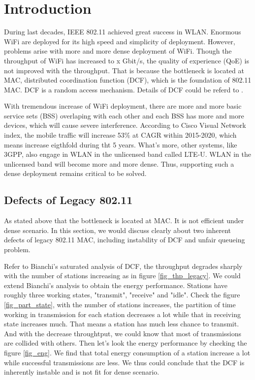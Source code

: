 \chapter{Introduction}  \label{chp_intro}
During last decades, IEEE 802.11 achieved great success in WLAN. Enormous WiFi are deployed for its high speed and simplicity of deployment. 
However, problems arise with more and more dense deployment of WiFi.
Though the throughput of WiFi has increased to x Gbit/s, the quality of experience (QoE) is not improved with the throughput.
That is because the bottleneck is located at MAC, distributed coordination function (DCF), which is the foundation of 802.11 MAC.
DCF is a random access mechanism. Details of DCF could be referd to \cite{bianchi2000performance}.

With tremendous increase of WiFi deployment, there are more and more basic service sets (BSS) overlaping with each other and each BSS has more and more devices, which will cause severe interference. 
According to Cisco Visual Network index\cite{cisco2016}, the mobile traffic will increase 53\% at CAGR within 2015-2020, which means increase eigthfold during tht 5 years.
What's more, other systems, like 3GPP, also engage in WLAN in the unlicensed band called LTE-U. WLAN in the unlicensed band will become more and more dense. 
Thus, supporting such a dense deployment remains critical to be solved. 

\section{Defects of Legacy 802.11}
As stated above that the bottleneck is located at MAC. It is not efficient under dense scenario.
In this section, we would discuss clearly about two inherent defects of legacy 802.11 MAC, including instability of DCF and unfair queueing problem.


\vspace*{0.5cm}

Refer to Bianchi's saturated analysis of DCF, the throughput degrades sharply with the number of stations increasing as in figure \ref{fig_thp_legacy}.
We could extend Bianchi's analysis to obtain the energy performance.
Stations have roughly three working states, "transmit", "receive" and "idle".
Check the figure \ref{fig_part_state}, with the number of stations increases, the partition of time working in transmission for each station decreases a lot while that in receiving state increases much. 
That means a station has much less chance to transmit. And with the decrease throughtput, we could know that most of transmissions are collided with others. 
Then let's look the energy performance by checking the figure \ref{fig_eng}. 
We find that total energy consumption of a station increase a lot while successful transmissions are less.
We thus could conclude that the DCF is inherently instable and is not fit for dense scenario.

